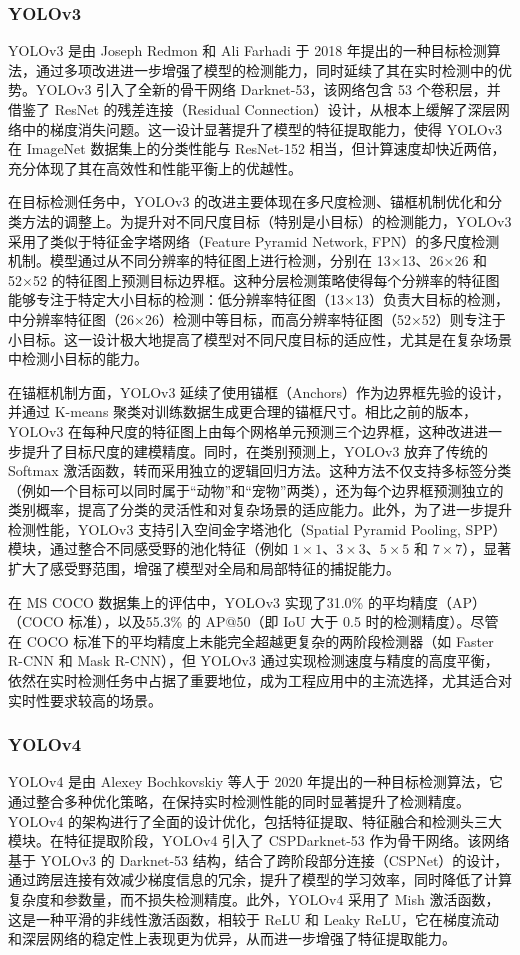 \documentclass[11pt,twocolumn]{ctexart}
\begin{document}
\subsubsection{YOLOv3}
YOLOv3\cite{farhadi2018yolov3} 是由 Joseph Redmon 和 Ali Farhadi 于 2018 年提出的一种目标检测算法，通过多项改进进一步增强了模型的检测能力，同时延续了其在实时检测中的优势。YOLOv3 引入了全新的骨干网络 Darknet-53，该网络包含 53 个卷积层，并借鉴了 ResNet\cite{he2016deep} 的残差连接（Residual Connection）设计，从根本上缓解了深层网络中的梯度消失问题。这一设计显著提升了模型的特征提取能力，使得 YOLOv3 在 ImageNet 数据集上的分类性能与 ResNet-152 相当，但计算速度却快近两倍，充分体现了其在高效性和性能平衡上的优越性。

在目标检测任务中，YOLOv3 的改进主要体现在多尺度检测、锚框机制优化和分类方法的调整上。为提升对不同尺度目标（特别是小目标）的检测能力，YOLOv3 采用了类似于特征金字塔网络（Feature Pyramid Network, FPN）\cite{lin2017feature}的多尺度检测机制。模型通过从不同分辨率的特征图上进行检测，分别在 13×13、26×26 和 52×52 的特征图上预测目标边界框。这种分层检测策略使得每个分辨率的特征图能够专注于特定大小目标的检测：低分辨率特征图（13×13）负责大目标的检测，中分辨率特征图（26×26）检测中等目标，而高分辨率特征图（52×52）则专注于小目标。这一设计极大地提高了模型对不同尺度目标的适应性，尤其是在复杂场景中检测小目标的能力。

在锚框机制方面，YOLOv3 延续了使用锚框（Anchors）作为边界框先验的设计，并通过 K-means 聚类对训练数据生成更合理的锚框尺寸。相比之前的版本，YOLOv3 在每种尺度的特征图上由每个网格单元预测三个边界框，这种改进进一步提升了目标尺度的建模精度。同时，在类别预测上，YOLOv3 放弃了传统的 Softmax 激活函数，转而采用独立的逻辑回归方法。这种方法不仅支持多标签分类（例如一个目标可以同时属于“动物”和“宠物”两类），还为每个边界框预测独立的类别概率，提高了分类的灵活性和对复杂场景的适应能力。此外，为了进一步提升检测性能，YOLOv3 支持引入空间金字塔池化（Spatial Pyramid Pooling, SPP）\cite{he2015spatial}模块，通过整合不同感受野的池化特征（例如 $1\times1$、$3\times3$、$5\times5$ 和 $7\times7$），显著扩大了感受野范围，增强了模型对全局和局部特征的捕捉能力。

在 MS COCO 数据集上的评估中，YOLOv3 实现了31.0\% 的平均精度（AP）（COCO 标准），以及55.3\% 的 AP@50（即 IoU 大于 0.5 时的检测精度）。尽管在 COCO 标准下的平均精度上未能完全超越更复杂的两阶段检测器（如 Faster R-CNN 和 Mask R-CNN），但 YOLOv3 通过实现检测速度与精度的高度平衡，依然在实时检测任务中占据了重要地位，成为工程应用中的主流选择，尤其适合对实时性要求较高的场景。
\subsubsection{YOLOv4}
YOLOv4\cite{bochkovskiy2020yolov4} 是由 Alexey Bochkovskiy 等人于 2020 年提出的一种目标检测算法，它通过整合多种优化策略，在保持实时检测性能的同时显著提升了检测精度。YOLOv4 的架构进行了全面的设计优化，包括特征提取、特征融合和检测头三大模块。在特征提取阶段，YOLOv4 引入了 CSPDarknet-53 作为骨干网络。该网络基于 YOLOv3 的 Darknet-53 结构，结合了跨阶段部分连接（CSPNet）的设计，通过跨层连接有效减少梯度信息的冗余，提升了模型的学习效率，同时降低了计算复杂度和参数量，而不损失检测精度。此外，YOLOv4 采用了 Mish 激活函数，这是一种平滑的非线性激活函数，相较于 ReLU 和 Leaky ReLU，它在梯度流动和深层网络的稳定性上表现更为优异，从而进一步增强了特征提取能力。
\end{document}
